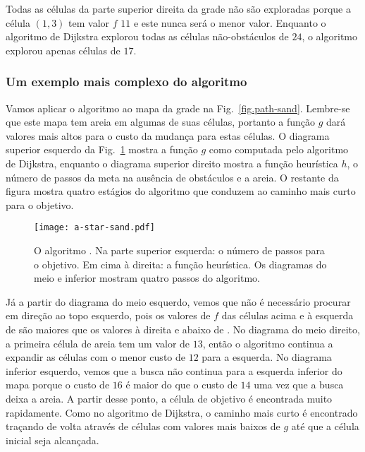 {Todas as células da parte superior direita da grade não são exploradas porque a célula $(1,3)$ tem valor $f$ $11$ e este nunca será o menor valor. Enquanto o algoritmo de Dijkstra explorou todas as células não-obstáculos de $24$, o algoritmo \astar{} explorou apenas células de $17$.

\subsubsection*{Um exemplo mais complexo do algoritmo \astar}

Vamos aplicar o algoritmo \astar{} ao mapa da grade na Fig.~\ref{fig.path-sand}. Lembre-se que este mapa tem areia em algumas de suas células, portanto a função $g$ dará valores mais altos para o custo da mudança para estas células. O diagrama superior esquerdo da Fig.~\ref{fig.a-star} mostra a função $g$ como computada pelo algoritmo de Dijkstra, enquanto o diagrama superior direito mostra a função heurística $h$, o número de passos da meta na ausência de obstáculos e a areia. O restante da figura mostra quatro estágios do algoritmo que conduzem ao caminho mais curto para o objetivo.

\begin{figure}
\begin{center}
\texttt{[image: a-star-sand.pdf]}
\end{center}
\caption{O algoritmo \astar{}. Na parte superior esquerda: o número de passos para o objetivo. Em cima à direita: a função heurística. Os diagramas do meio e inferior mostram quatro passos do algoritmo.}\label{fig.a-star}
\end{figure}

Já a partir do diagrama do meio esquerdo, vemos que não é necessário procurar em direção ao topo esquerdo, pois os valores de $f$ das células acima e à esquerda de  são maiores que os valores à direita e abaixo de . No diagrama do meio direito, a primeira célula de areia tem um valor de $13$, então o algoritmo continua a expandir as células com o menor custo de $12$ para a esquerda. No diagrama inferior esquerdo, vemos que a busca não continua para a esquerda inferior do mapa porque o custo de $16$ é maior do que o custo de $14$ uma vez que a busca deixa a areia. A partir desse ponto, a célula de objetivo  é encontrada muito rapidamente. Como no algoritmo de Dijkstra, o caminho mais curto é encontrado traçando de volta através de células com valores mais baixos de $g$ até que a célula inicial seja alcançada.

}
